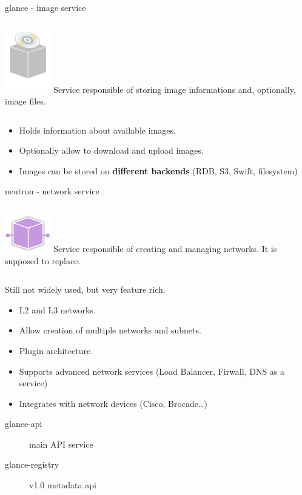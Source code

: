 \documentclass[english,serif,mathserif,usenames,dvipsnames]{beamer}
\begin{document}
\begin{frame}
  {glance - image service}
  \begin{columns}
    \column{2cm}
    \includegraphics[width=2cm]{glance-icon.png}
    \column{8cm}
    Service responsible of storing image informations and, optionally,
    image files.
  \end{columns}

  \+
  \begin{itemize}
  \item Holds information about available images.
  \item Optionally allow to download and upload images.
  \item Images can be stored on \textbf{different backends} (RDB, S3,
    Swift, filesystem)
  \end{itemize}
\end{frame}


\begin{frame}
  {neutron - network service}

  \begin{columns}
    \column{2cm}
    \includegraphics[width=2cm]{openstack-networking-icon.png}
    \column{8cm}
    Service responsible of creating and managing networks. It is
    supposed to replace.
  \end{columns}

  \+\+
  Still not widely used, but very feature rich.


  \begin{itemize}
  \item L2 and L3 networks.
  \item Allow creation of multiple networks and subnets.
  \item Plugin architecture.
  \item Supports advanced network services (Load Balancer, Firwall,
    DNS as a service)
  \item Integrates with network devices (Cisco, Brocade\ldots)
  \end{itemize}

  \begin{description}
  \item[glance-api] main API service
  \item[glance-registry] v1.0 metadata api
  \end{description}
\end{frame}
\end{document}
